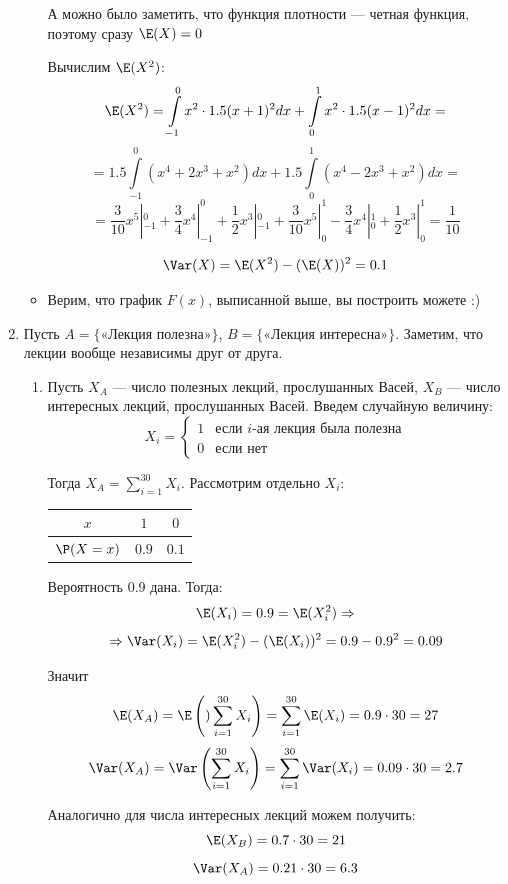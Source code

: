 \begin{enumerate}
\begin{itemize}
А можно было заметить, что функция плотности — четная функция, поэтому сразу $\E(X) = 0$

Вычислим $\E(X^2)$:
\[\E(X^2) = \int \limits_{-1}^0 x^2 \cdot 1.5 (x + 1)^2 dx +  \int \limits_0^1 x^2 \cdot 1.5 (x - 1)^2 dx = \]
\[= 1.5 \int \limits_{-1}^0\left( x^4 + 2x^3 + x^2\right) dx + 1.5 \int \limits_0^1\left( x^4 -2x^3 + x^2\right) dx = \]
\[=  \frac{3}{10} x^5 |_{-1}^0 + \frac{3}{4} x^4|_{-1}^0 + \frac{1}{2} x^3 |_{-1}^0 +  \frac{3}{10} x^5 |_0^1 - \frac{3}{4} x^4|_0^1  + \frac{1}{2} x^3 |_0^1 =  \frac{1}{10}\]

\[\Var(X) = \E(X^2) - (\E(X))^2 = 0.1\]

\item Верим, что график $F(x)$, выписанной выше, вы построить можете :)
\end{itemize}
\item
Пусть $A = \{\text{«Лекция полезна»}\}$, $B = \{\text{«Лекция интересна»}\}$. Заметим, что лекции вообще независимы друг от друга.

\begin{enumerate}
\item Пусть $X_A$ — число полезных лекций, прослушанных Васей,  $X_B$ — число интересных лекций, прослушанных Васей. Введем случайную величину:
\[X_i =
\begin{cases}
1 & \text{если } i\text{-ая лекция была полезна}\\
0 & \text{если нет}
\end{cases}
\]

Тогда $X_A = \sum\limits_{i=1}^{30}X_i$. Рассмотрим отдельно $X_i$:

\begin{tabular}{@{}ccc@{}}
\toprule
$x$         & $1$             & $0$               \\ \midrule
$\P(X=x)$ & $0.9$ & $0.1$ \\ \bottomrule
\end{tabular}

Вероятность 0.9 дана. Тогда:
\[
\E(X_i) = 0.9 = \E(X^2_i) \Rightarrow
\]
\[
\Rightarrow \Var(X_i) = \E(X^2_i) - (\E(X_i))^2 = 0.9 - 0.9^2 = 0.09
\]

Значит
\[
\E(X_A) = \E\left()\sum\limits_{i=1}^{30}X_i\right) = \sum\limits_{i=1}^{30}\E(X_i)  = 0.9\cdot30 = 27
\]
\[
\Var(X_A) = \Var\left(\sum\limits_{i=1}^{30}X_i\right) = \sum\limits_{i=1}^{30}\Var(X_i) = 0.09\cdot30 = 2.7
\]

Аналогично для числа интересных лекций можем получить:
\[
\E(X_B) = 0.7\cdot 30 = 21
\]
\[
\Var(X_A) = 0.21\cdot 30 = 6.3
\]



\end{enumerate}
\end{enumerate}
